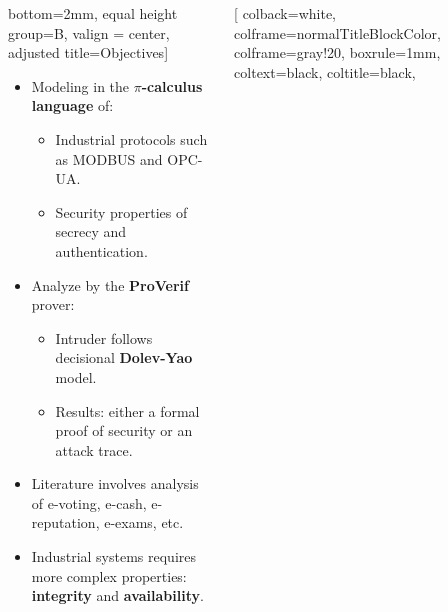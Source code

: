 \documentclass{beamer}
\newcommand{\proverif}{ProVerif\xspace}
\newcommand{\modbus}{MODBUS\xspace}
\newcommand{\opcua}{OPC-UA\xspace}
\begin{document}
\begin{frame}[fragile]{}
\begin{tcolorbox}[adjusted title={\centering\large Formal Analysis of Industrial Protocols}]
\begin{columns}[T]
\begin{column}{.35\textwidth}
\begin{tcolorbox}
                bottom=2mm,
                equal height group=B,
                valign = center,
                adjusted title={\large Objectives}]
                    \vspace{.5em}
                    \begin{itemize}
                        \item Modeling in the {\bf $\pi$-calculus language} of:
                        \begin{itemize}
                            \item Industrial protocols such as \modbus and \opcua.
                            \item Security properties of secrecy and authentication.
                        \end{itemize}
                    \vspace{.5em}
                        \item Analyze by the {\bf \proverif} prover:
                        \begin{itemize}
                            \item Intruder follows decisional {\bf Dolev-Yao} model.
                            \item Results: either a formal proof of security or an attack trace.
                        \end{itemize}
                    \vspace{.5em}
                        \item Literature involves analysis of e-voting, e-cash, e-reputation, e-exams, etc.
                    \vspace{.5em}
                    \item Industrial systems requires more complex properties: {\bf integrity} and {\bf availability}.
                    \end{itemize}
                \end{tcolorbox}
            \end{column}
            \begin{column}{.65\textwidth}
                \begin{tcolorbox}[
                colback=white, %
                colframe=normalTitleBlockColor, %
                colframe=gray!20, %
                boxrule=1mm,
                coltext=black, %
                coltitle=black, %

\end{tcolorbox}
\end{column}
\end{columns}
\end{tcolorbox}
\end{frame}
\end{document}
